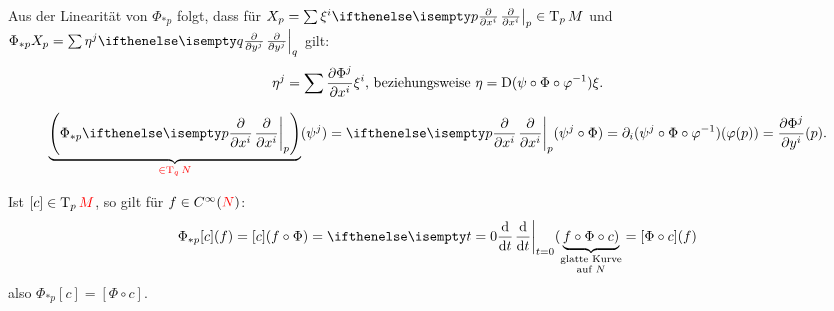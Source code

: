 \begin{bem}
  Aus der Linearität von $\Phi_{*p}$ folgt, dass für $X_p = \sum \xi^i\pdifffrac[p]{}{x^i} \in \T_pM$ und $\Phi_{*p}X_p = \sum \eta^j\pdifffrac[q]{}{y^j}$ gilt:
  \begin{align*}
    \eta^j = \sum \frac{\partial \Phi^j}{\partial x^i}\xi^i \text{, beziehungsweise } \eta = \operatorname{D}(\psi \circ \Phi \circ \varphi^{-1})\xi.
  \end{align*}
\end{bem}

\begin{bew}
  \begin{align*}
    \underbrace{\left(\Phi_{*p}\pdifffrac[p]{}{x^i}\right)}_{\textcolor{red}{\in \T_qN}}(\psi^j) = \pdifffrac[p]{}{x^i}(\psi^j \circ \Phi) = \partial_i (\psi^j \circ \Phi \circ \varphi^{-1})(\varphi(p)) = \frac{\partial \Phi^j}{\partial y^i}(p).
  \end{align*}
\end{bew}

\begin{bem}
  Ist $[c] \in \operatorname{T}_p\textcolor{red}{M}$, so gilt für $f \in C^{\infty}(\textcolor{red}{N})$:
  \begin{align*}
    \Phi_{*p}[c](f) = [c](f \circ \Phi) = \difffrac[t=0]{}{t}(\underbrace{f \circ \Phi \circ c)}_{\substack{\text{glatte Kurve}\\ \text{auf }N}} = [\Phi \circ c](f)
  \end{align*}
  also $\Phi_{*p}[c] = [\Phi \circ c]$.
\end{bem}

